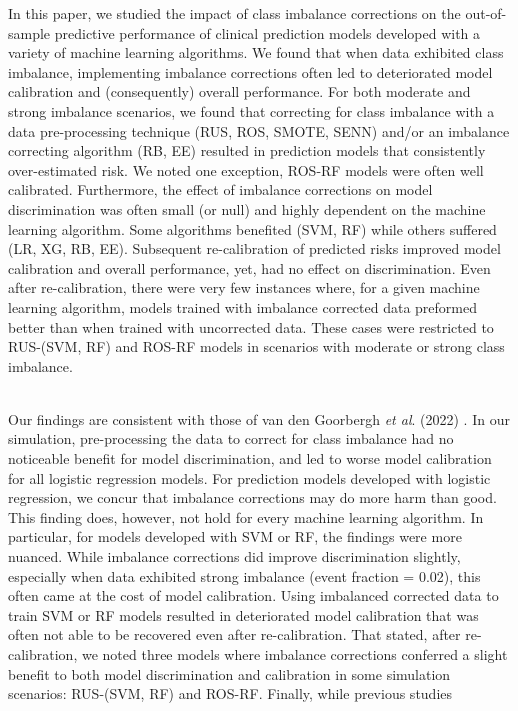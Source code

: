 \documentclass[AMA,STIX1COL,]{WileyNJD-v2}
\begin{document}
In this paper, we studied the impact of class imbalance corrections on
the out-of-sample predictive performance of clinical prediction models
developed with a variety of machine learning algorithms. We found that
when data exhibited class imbalance, implementing imbalance corrections
often led to deteriorated model calibration and (consequently) overall
performance. For both moderate and strong imbalance scenarios, we found
that correcting for class imbalance with a data pre-processing technique
(RUS, ROS, SMOTE, SENN) and/or an imbalance correcting algorithm (RB,
EE) resulted in prediction models that consistently over-estimated risk.
We noted one exception, ROS-RF models were often well calibrated.
Furthermore, the effect of imbalance corrections on model discrimination
was often small (or null) and highly dependent on the machine learning
algorithm. Some algorithms benefited (SVM, RF) while others suffered
(LR, XG, RB, EE). Subsequent re-calibration of predicted risks improved
model calibration and overall performance, yet, had no effect on
discrimination. Even after re-calibration, there were very few instances
where, for a given machine learning algorithm, models trained with
imbalance corrected data preformed better than when trained with
uncorrected data. These cases were restricted to RUS-(SVM, RF) and
ROS-RF models in scenarios with moderate or strong class imbalance.\\
\strut \\
Our findings are consistent with those of van den Goorbergh
\emph{et al}. (2022) \citep{ruben}. In our simulation, pre-processing
the data to correct for class imbalance had no noticeable benefit for
model discrimination, and led to worse model calibration for all
logistic regression models. For prediction models developed with
logistic regression, we concur that imbalance corrections may do more
harm than good. This finding does, however, not hold for every machine
learning algorithm. In particular, for models developed with SVM or RF,
the findings were more nuanced. While imbalance corrections did improve
discrimination slightly, especially when data exhibited strong imbalance
(event fraction = 0.02), this often came at the cost of model
calibration. Using imbalanced corrected data to train SVM or RF models
resulted in deteriorated model calibration that was often not able to be
recovered even after re-calibration. That stated, after re-calibration,
we noted three models where imbalance corrections conferred a slight
benefit to both model discrimination and calibration in some simulation
scenarios: RUS-(SVM, RF) and ROS-RF. Finally, while previous studies
\end{document}
